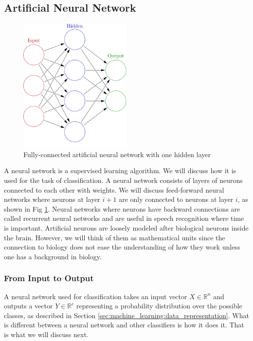 \documentclass{kththesis}
\begin{document}
\subsection{Artificial Neural Network}
\begin{figure}
\centering
\includegraphics[width=0.5\textwidth]{images/ann.png}
\caption{Fully-connected artificial neural network with one hidden layer}
\label{fig:ann}
\end{figure}

A neural network is a supervised learning algorithm. We will discuss how it is used for the task of classification. A neural network consists of layers  of neurons connected to each other with weights. We will discuss feed-forward neural networks where neurons at layer $i+1$ are only connected to neurons at layer $i$, as shown in Fig \ref{fig:ann}. Neural networks where neurons have backward connections are called recurrent neural networks and are useful in speech recognition where time is important.  Artificial neurons are loosely modeled after biological  neurons inside the brain. However, we will  think of them as mathematical units since the connection to biology does not ease the understanding of  how they work unless one has a background in biology.

\subsubsection{From Input to Output}
A neural network used for classification takes an input vector $X \in \mathbb{R}^{n}$ and outputs a vector $Y \in \mathbb{R}^{c}$ representing a probability distribution over the possible classes, as described in Section \ref{sec:machine_learning:data_representation}. What is different between a neural network and other classifiers is how it does it. That is what we will discuss next. 
\end{document}
